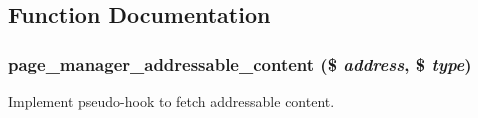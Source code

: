 \subsection{Function Documentation}
\hypertarget{page__manager_8module_a0ca842046b6ffb242872041ef3db981b}{
\subsubsection[{page\_\-manager\_\-addressable\_\-content}]{\setlength{\rightskip}{0pt plus 5cm}page\_\-manager\_\-addressable\_\-content (\$ {\em address}, \/  \$ {\em type})}}
\label{page__manager_8module_a0ca842046b6ffb242872041ef3db981b}
Implement pseudo-\/hook to fetch addressable content.

